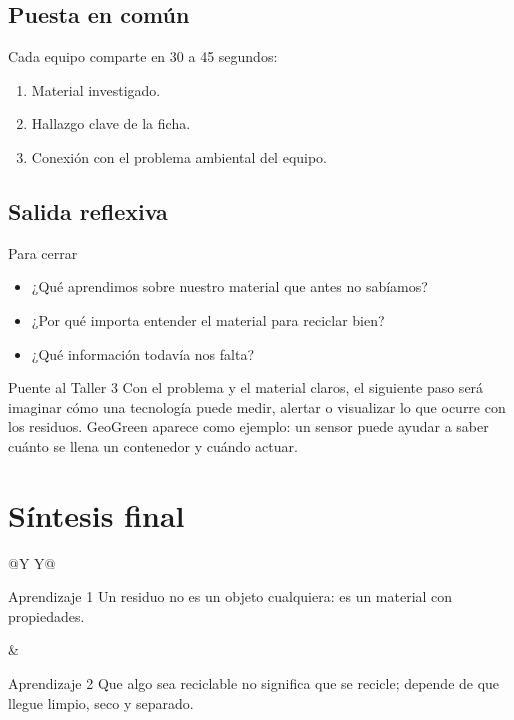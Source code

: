 \documentclass[10pt,a4paper]{article}
\begin{document}
\subsection{Puesta en común}
Cada equipo comparte en 30 a 45 segundos:
\begin{enumerate}
  \item Material investigado.
  \item Hallazgo clave de la ficha.
  \item Conexión con el problema ambiental del equipo.
\end{enumerate}

\subsection{Salida reflexiva}
\begin{infobox}{Para cerrar}
\begin{itemize}
  \item ¿Qué aprendimos sobre nuestro material que antes no sabíamos?
  \item ¿Por qué importa entender el material para reciclar bien?
  \item ¿Qué información todavía nos falta?
\end{itemize}
\end{infobox}

\begin{keybox}{Puente al Taller 3}
Con el problema y el material claros, el siguiente paso será imaginar cómo una tecnología puede medir, alertar o visualizar lo que ocurre con los residuos. GeoGreen aparece como ejemplo: un sensor puede ayudar a saber cuánto se llena un contenedor y cuándo actuar.
\end{keybox}

\newpage
\section{Síntesis final}

\begin{tabularx}{\textwidth}{@{}Y Y@{}}
\begin{infobox}[height=34mm]{Aprendizaje 1}
Un residuo no es un objeto cualquiera: es un material con propiedades.
\end{infobox}
&
\begin{infobox}[height=34mm]{Aprendizaje 2}
Que algo sea reciclable no significa que se recicle; depende de que llegue limpio, seco y separado.
\end{infobox}
\end{tabularx}
\end{document}
